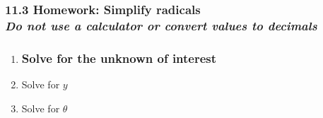 \documentclass[12pt, twoside]{article}
\begin{document}
\subsubsection*{11.3 Homework: Simplify radicals \\
\emph{Do not use a calculator or convert values to decimals}}

\begin{enumerate}

\subsubsection*{Simplify each expression}
\item 
\begin{enumerate}[itemsep=3cm]
  \end{enumerate} \vspace{2cm}

\subsubsection*{Solve for the unknown of interest}

\item Solve for $y$ 
\begin{enumerate}
  \end{enumerate} \vspace{4cm}

\item Solve for $\theta$
\begin{enumerate}
  \end{enumerate}

\end{enumerate}
\end{document}
